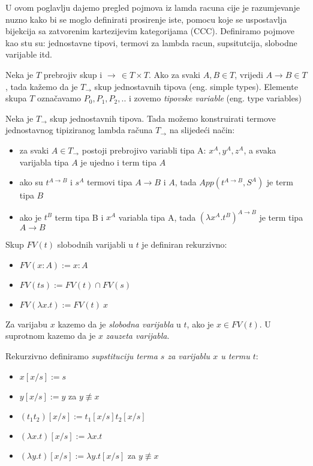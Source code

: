 U ovom poglavlju dajemo pregled pojmova iz lamda racuna cije je razumjevanje nuzno kako bi se moglo definirati prosirenje iste, pomocu koje se uspostavlja bijekcija sa zatvorenim kartezijevim kategorijama (CCC). Definiramo pojmove kao stu su: jednostavne tipovi, termovi za lambda racun, supsitutcija, slobodne varijable itd.

\begin{definition}
  Neka je $T$ prebrojiv skup i $\to \, \in T \times T$.
    Ako za svaki $A, B \in T$, vrijedi $A \to B \in T$, tada kažemo da je $T_{\to}$ skup jednostavnih tipova (eng. simple types). Elemente skupa $T$ označavamo $P_0, P_1, P_2, ..$ i zovemo \emph{tipovske variable} (eng. type variables)
\end{definition}



\begin{definition}
  Neka je $T_\to$ skup jednostavnih tipova. Tada možemo konstruirati termove jednostavnog tipiziranog lambda računa $T_\to$ na slijedeći način:
  \begin{itemize}
    \item za svaki $A \in T_\to$ postoji prebrojivo variabli tipa A: $x^A, y^A, z^A$, a svaka varijabla tipa $A$ je ujedno i term tipa $A$
    \item ako su $t^{A \to B}$ i $s^A$ termovi tipa $A \to B$ i $A$, tada $App(t^{A \to B}, S^A)$ je term tipa $B$
    \item ako je $t^B$ term tipa B i $x^A$ variabla tipa A, tada $(\lambda x^A . t^B)^{A \to B}$ je term tipa ${A \to B}$
  \end{itemize}
\end{definition}

\begin{definition}
  Skup $FV(t)$ slobodnih varijabli u $t$ je definiran rekurzivno:
  \begin{itemize}
    \item $FV(x : A) := x : A$
    \item $FV(ts) := FV(t) \cap FV(s)$
    \item $FV(\lambda x . t) := FV(t) \ {x}$
  \end{itemize}
  Za varijabu $x$ kazemo da je \emph{slobodna varijabla} u $t$, ako je $x \in FV(t)$. U suprotnom kazemo da je $x$ \emph{zauzeta varijabla}.
\end{definition}

\begin{definition}[Supstitucija]
  Rekurzivno definiramo \emph{supstituciju terma $s$ za varijablu $x$ u termu $t$}:
  \begin{itemize}
    \item $x[x/s] := s$
    \item $y[x/s] := y$ za $y \not\equiv x$
    \item $(t_1t_2)[x/s] := t_1[x/s]t_2[x/s]$
    \item $(\lambda x . t)[x / s] := \lambda x . t$
    \item $(\lambda y . t)[x / s] := \lambda y . t[x/s]$ za $y \not\equiv x$
  \end{itemize}
\end{definition}

